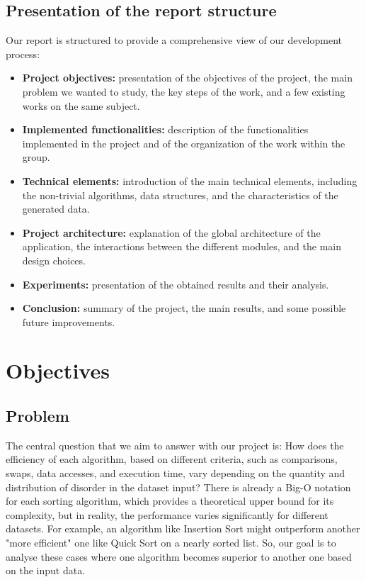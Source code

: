 \documentclass{article}
\begin{document}
\subsection{Presentation of the report structure}
Our report is structured to provide a comprehensive view of our development 
process:
\begin{itemize}
    \item \textbf{Project objectives:} presentation of the objectives of the project, 
the main problem we wanted to study, the key steps of the work, and a few existing
works on the same subject.
    \item \textbf{Implemented functionalities:} description of the functionalities 
implemented in the project and of the organization of the work within the group.
    \item \textbf{Technical elements:} introduction of the main technical elements, 
including the non-trivial algorithms, data structures, and the characteristics of the 
generated data.
    \item \textbf{Project architecture:} explanation of the global architecture of the 
application, the interactions between the different modules, and the main design 
choices.
    \item \textbf{Experiments:} presentation of the obtained results and their 
analysis.
    \item \textbf{Conclusion:} summary of the project, the main results, and some 
possible future improvements.
\end{itemize}

\section{Objectives}

\subsection{Problem}
The central question that we aim to answer with our project is: How does the efficiency of each algorithm, based on different criteria, such as comparisons, swaps, data accesses, and execution time, vary depending on the quantity and distribution of disorder in the dataset input? There is already a Big-O notation for each sorting algorithm, which provides a theoretical upper bound for its complexity, but in reality, the performance varies significantly for different datasets. For example, an algorithm like Insertion Sort might outperform another "more efficient" one like Quick Sort on a nearly sorted list. So, our goal is to analyse these cases where one algorithm becomes superior to another one based on the input data.
\end{document}
